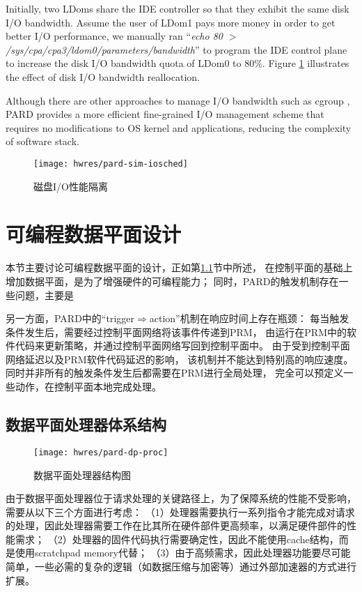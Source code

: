 Initially, two LDoms share the IDE controller so that they exhibit the same
disk I/O bandwidth. Assume the user of LDom1 pays more money in order to get
better I/O performance, we manually ran
``\emph{echo 80 $>$ /sys/cpa/cpa3/ldom0/parameters/bandwidth}''
to program the IDE control plane
to increase the disk I/O bandwidth quota of LDom0 to 80\%.
Figure \ref{fig:pardsim:iosched} illustrates the effect of disk I/O
bandwidth reallocation.

Although there are other approaches to manage I/O bandwidth such as cgroup \cite{cgroup},
PARD provides a more efficient fine-grained I/O management scheme that requires
no modifications to OS kernel and applications, reducing the complexity of software
stack.

\begin{figure}[tb]
  \centering
  \texttt{[image: hwres/pard-sim-iosched]}
  \caption{磁盘I/O性能隔离}
  \label{fig:pardsim:iosched}
\end{figure}


\section{可编程数据平面设计}

本节主要讨论可编程数据平面的设计，正如第\ref{}节中所述，
在控制平面的基础上增加数据平面，是为了增强硬件的可编程能力；
同时，PARD的触发机制存在一些问题，主要是

另一方面，PARD中的``trigger$\Rightarrow$action''机制在响应时间上存在瓶颈：
每当触发条件发生后，需要经过控制平面网络将该事件传递到PRM，
由运行在PRM中的软件代码来更新策略，并通过控制平面网络写回到控制平面中。
由于受到控制平面网络延迟以及PRM软件代码延迟的影响，
该机制并不能达到特别高的响应速度。
同时并非所有的触发条件发生后都需要在PRM进行全局处理，
完全可以预定义一些动作，在控制平面本地完成处理。

\subsection{数据平面处理器体系结构}

\begin{figure}[tb]
  \centering
  \texttt{[image: hwres/pard-dp-proc]}
  \caption{数据平面处理器结构图}
  \label{fig:pard-dp-proc}
\end{figure}

由于数据平面处理器位于请求处理的关键路径上，为了保障系统的性能不受影响，需要从以下三个方面进行考虑：
（1）处理器需要执行一系列指令才能完成对请求的处理，因此处理器需要工作在比其所在硬件部件更高频率，以满足硬件部件的性能需求；
（2）处理器的固件代码执行需要确定性，因此不能使用cache结构，而是使用scratchpad memory代替；
（3）由于高频需求，因此处理器功能要尽可能简单，一些必需的复杂的逻辑（如数据压缩与加密等）通过外部加速器的方式进行扩展。

